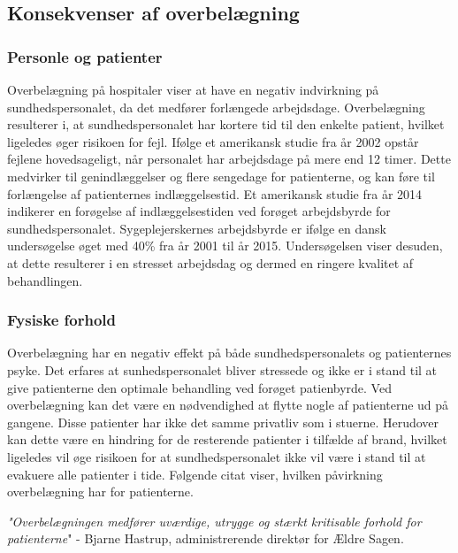 \subsection{Konsekvenser af overbelægning}


\subsubsection{Personle og patienter}
Overbelægning på hospitaler viser at have en negativ indvirkning på sundhedspersonalet, da det medfører forlængede arbejdsdage.\citep{Kjeldsen2015} \citep{Dinges2004} Overbelægning resulterer i, at sundhedspersonalet har kortere tid til den enkelte patient, hvilket ligeledes øger risikoen for fejl. Ifølge et amerikansk studie fra år 2002 opstår fejlene hovedsageligt, når personalet har arbejdsdage på mere end 12 timer.\citep{Dinges2004} Dette medvirker til genindlæggelser og flere sengedage for patienterne, og kan føre til forlængelse af patienternes indlæggelsestid. Et amerikansk studie fra år 2014 indikerer en forøgelse af indlæggelsestiden ved forøget arbejdsbyrde for sundhedspersonalet\citep{Elliott2014}. Sygeplejerskernes arbejdsbyrde er ifølge en dansk undersøgelse øget med 40\% fra år 2001 til år 2015. Undersøgelsen viser desuden, at dette resulterer i en stresset arbejdsdag og dermed en ringere kvalitet af behandlingen.\citep{Kjeldsen2015}  

\subsubsection{Fysiske forhold}

Overbelægning har en negativ effekt på både sundhedspersonalets og patienternes psyke. Det erfares at sunhedspersonalet bliver stressede og ikke er i stand til at give patienterne den optimale behandling ved forøget patienbyrde. \citep{Aiken2002} 
Ved overbelægning kan det være en nødvendighed at flytte nogle af patienterne ud på gangene. Disse patienter har ikke det samme privatliv som i stuerne. Herudover kan dette være en hindring for de resterende patienter i tilfælde af brand, hvilket ligeledes vil øge risikoen for at sundhedspersonalet ikke vil være i stand til at evakuere alle patienter i tide. \citep{Madsen2014} Følgende citat viser, hvilken påvirkning overbelægning har for patienterne. 

   \citep{Madsen2014} \textit{"Overbelægningen medfører uværdige, utrygge og stærkt kritisable forhold for patienterne}" - Bjarne Hastrup, administrerende direktør for Ældre Sagen. \citep{Politiken2013}


